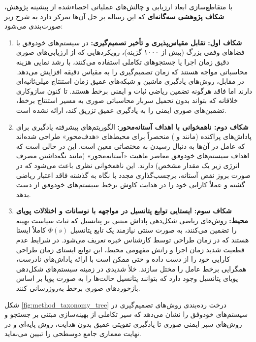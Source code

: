 \documentclass[oneside,openany,phd]{TMU-Thesis}
\begin{document}
با متقاطع‌سازی ابعاد ارزیابی و چالش‌های عملیاتی احصاءشده از پیشینه پژوهش، \textbf{شکاف پژوهشی سه‌گانه‌ای} که این رساله بر حل آن‌ها تمرکز دارد به شرح زیر صورت‌بندی می‌شود:

\begin{enumerate}
    \item \textbf{شکاف اول: تقابل مقیاس‌پذیری و تأخیر تصمیم‌گیری:}
    در سیستم‌های خودوفق با فضاهای وفقی بزرگ (بیش از ۱۰۰۰ گزینه)، رویکردهایی که از ارزیابی‌های صوری دقیق زمان اجرا یا جستجوهای تکاملی استفاده می‌کنند، با رشد نمایی هزینه محاسباتی مواجه هستند که زمان تصمیم‌گیری را به مقیاس دقیقه افزایش می‌دهد. در مقابل، روش‌های یادگیری ماشین و شبکه‌های عمیق زمان استنتاج میلی‌ثانیه‌ای دارند اما فاقد هرگونه تضمین ریاضی ثبات و ایمنی برخط هستند. تا کنون سازوکاری خلاقانه که بتواند بدون تحمیل سربار محاسباتی صوری به مسیر استنتاج برخط، تضمین‌های صوری ایمنی را به یادگیری عمیق تزریق کند، ارائه نشده است.
    
    \item \textbf{شکاف دوم: ناهمخوانی با اهداف آستانه‌محور:}
    الگوریتم‌های پیشرفته یادگیری برای پاداش‌های پراکنده (مانند  و ) منحصراً برای محیط‌های «هدف‌محور» طراحی شده‌اند که عامل در آن‌ها به دنبال رسیدن به مختصاتی معین است. این در حالی است که اهداف سیستم‌های خودوفق معاصر ماهیت «آستانه‌محور» (مانند نگه‌داشتن مصرف انرژی زیر یک مقدار مشخص) دارند. این ناهمخوانی نظری باعث می‌شود که در صورت بروز نقض آستانه، برچسب‌گذاری مجدد با نگاه به گذشته فاقد اعتبار ریاضی گشته و عملاً کارایی خود را در هدایت کاوش برخط سیستم‌های خودوفق از دست بدهد.
    
    \item \textbf{شکاف سوم: ایستایی توابع پتانسیل در مواجهه با نوسانات و اختلالات پویای محیط:}
    روش‌های ریاضی شکل‌دهی پاداش مبتنی بر پتانسیل \cite{ng1999policy} که ثبات سیاست بهینه را تضمین می‌کنند، به صورت سنتی نیازمند یک تابع پتانسیل $\Phi(s)$ کاملاً ایستا هستند که در زمان طراحی توسط کارشناس خبره تعریف می‌شود. در شرایط عدم قطعیت شدید زمان اجرا و رانش مفهومی محیط، این توابع ایستای زمان طراحی کارایی خود را از دست داده و حتی ممکن است با ارائه پاداش‌های نادرست، همگرایی برخط عامل را مختل سازند. خلأ شدیدی در زمینه سیستم‌های شکل‌دهی پویای پتانسیل وجود دارد که بتوانند پتانسیل حالت‌ها را به صورت پویا بر اساس بازخوردهای صوری برخط به‌روزرسانی کنند.
\end{enumerate}

شکل \ref{fig:method_taxonomy_tree} درخت رده‌بندی روش‌های تصمیم‌گیری در سیستم‌های خودوفق را نشان می‌دهد که سیر تکاملی از بهینه‌سازی مبتنی بر جستجو و روش‌های سپر ایمنی صوری تا یادگیری تقویتی عمیق بدون هدایت، روش پایه‌ای  و در نهایت معماری جامع دوسطحی \rsdrlplus را تبیین می‌نماید.
\end{document}

